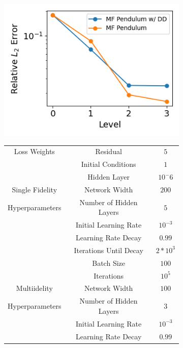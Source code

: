 \documentclass[12pt]{article}
\begin{document}
\begin{figure}[htpb]
\centering
    \begin{subfigure}{0.4\textwidth}
	\includegraphics[width=\linewidth]{imgs/pend_errors2}
        \caption{}
        \label{subfig:a}
    \end{subfigure}
    \begin{subfigure}{0.59\textwidth}
    \scriptsize
	\begin{center}
	\begin{tabular}{|c|c|c|} 
 	\hline
	 Loss Weights & Residual				& $5$ \\  
	 			& Initial Conditions		& $1$ \\ 
	 			& Hidden Layer	& $10^-6$ \\
	\hline
	Single Fidelity	& Network Width			& $200$ \\
	Hyperparameters & Number of Hidden Layers & $5$ \\
					& Initial Learning Rate & $10^{-3}$ \\
					& Learning Rate Decay & $0.99$ \\
					& Iterations Until Decay & $2*10^3$ \\
					& Batch Size & $100$ \\
					& Iterations & $10^5$ \\
 	\hline
	Multiidelity		& Network Width			& $100$ \\
	Hyperparameters & Number of Hidden Layers & $3$ \\
					& Initial Learning Rate & $10^{-3}$ \\
					& Learning Rate Decay & $0.99$ \\

\end{tabular}
\end{center}
\end{subfigure}
\end{figure}
\end{document}
